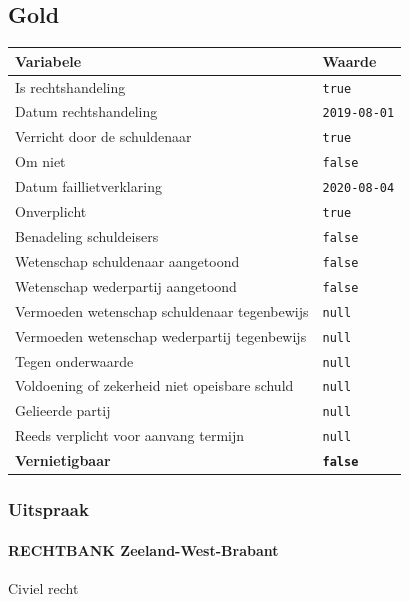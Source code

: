 \documentclass[
  dutch,
  a4paper,
]{article}
\begin{document}
\subsection{Gold}\label{gold-4}

\begin{center}
\small
\begin{tabular}{@{}p{8cm}p{2.6cm}@{}}
\toprule
Variabele & Waarde \\
\midrule
Is rechtshandeling & \texttt{true} \\
Datum rechtshandeling & \texttt{2019-08-01} \\
Verricht door de schuldenaar & \texttt{true} \\
Om niet & \texttt{false} \\
Datum faillietverklaring & \texttt{2020-08-04} \\
Onverplicht & \texttt{true} \\
Benadeling schuldeisers & \texttt{false} \\
Wetenschap schuldenaar aangetoond & \texttt{false} \\
Wetenschap wederpartij aangetoond & \texttt{false} \\
Vermoeden wetenschap schuldenaar tegenbewijs & \texttt{null} \\
Vermoeden wetenschap wederpartij tegenbewijs & \texttt{null} \\
Tegen onderwaarde & \texttt{null} \\
Voldoening of zekerheid niet opeisbare schuld & \texttt{null} \\
Gelieerde partij & \texttt{null} \\
Reeds verplicht voor aanvang termijn & \texttt{null} \\
\textbf{Vernietigbaar} & \textbf{\texttt{false}} \\
\bottomrule
\end{tabular}
\end{center}

\subsubsection{Uitspraak}\label{uitspraak-4}

\paragraph{RECHTBANK Zeeland-West-Brabant}\label{rechtbank-zeeland-west-brabant}

Civiel recht
\end{document}
